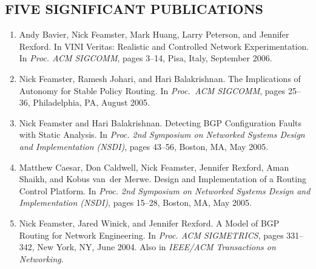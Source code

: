 \documentclass[11pt]{article}
\begin{document}
\subsection*{FIVE SIGNIFICANT PUBLICATIONS} 
\begin{enumerate}



\item
Andy Bavier, Nick Feamster, Mark Huang, Larry Peterson, and Jennifer Rexford.
{In VINI Veritas: Realistic and Controlled Network Experimentation}.
In {\em {Proc. {ACM SIGCOMM}}}, pages 3--14, Pisa, Italy, September 2006.


\item
Nick Feamster, Ramesh Johari, and Hari Balakrishnan.
{The Implications of Autonomy for Stable Policy Routing}.
In {\em {Proc.\ ACM SIGCOMM}}, pages 25--36, Philadelphia, {PA}, August 2005.

\item
Nick Feamster and Hari Balakrishnan.
{Detecting BGP Configuration Faults with Static Analysis}.
In {\em Proc. 2nd Symposium on Networked Systems Design and
  Implementation (NSDI)}, pages 43--56, Boston, MA, May 2005.

\item
Matthew Caesar, Don Caldwell, Nick Feamster, Jennifer Rexford, Aman
Shaikh, and Kobus van~der Merwe.
{Design and Implementation of a Routing Control Platform}.
In {\em Proc. 2nd Symposium on Networked Systems Design and Implementation (NSDI)}, pages 15--28, Boston, MA, May 2005.

\item
Nick Feamster, Jared Winick, and Jennifer Rexford.
{A Model of {BGP} Routing for Network Engineering}.
In {\em {Proc. ACM SIGMETRICS}}, pages 331--342, New York, NY, June 2004.
Also in {\em IEEE/ACM Transactions on Networking}.






\end{enumerate}
\end{document}
